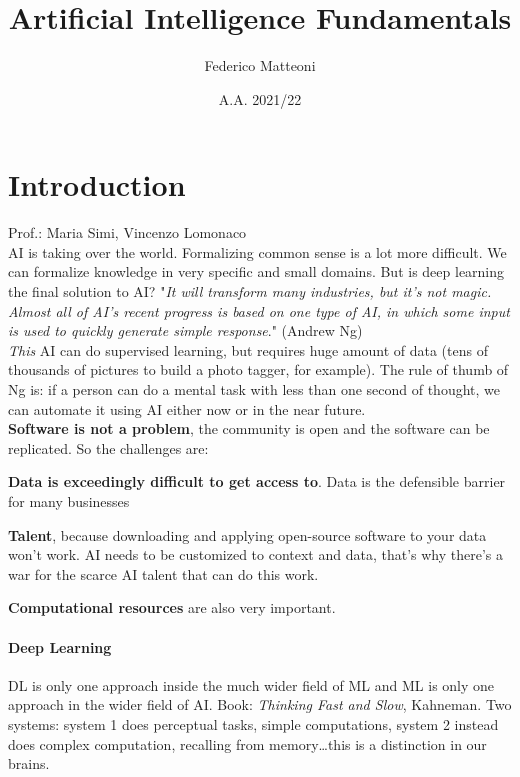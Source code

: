 \documentclass[10pt]{report}
\begin{document}
\title{Artificial Intelligence Fundamentals}
\author{Federico Matteoni}
\date{A.A. 2021/22}
\renewcommand*\contentsname{Index}
\maketitle
\tableofcontents
\pagebreak
\section{Introduction}
Prof.: Maria Simi, Vincenzo Lomonaco\\
AI is taking over the world. Formalizing common sense is a lot more difficult. We can formalize knowledge in very specific and small domains. But is deep learning the final solution to AI? "\textit{It will transform many industries, but it's not magic. Almost all of AI's recent progress is based on one type of AI, in which some input is used to quickly generate simple response}." (Andrew Ng)\\
\textit{This} AI can do supervised learning, but requires huge amount of data (tens of thousands of pictures to build a photo tagger, for example). The rule of thumb of Ng is: if a person can do a mental task with less than one second of thought, we can automate it using AI either now or in the near future.\\
\textbf{Software is not a problem}, the community is open and the software can be replicated. So the challenges are:
\begin{list}{}{}
	\item \textbf{Data is exceedingly difficult to get access to}. Data is the defensible barrier for many businesses
	\item \textbf{Talent}, because downloading and applying open-source software to your data won't work. AI needs to be customized to context and data, that's why there's a war for the scarce AI talent that can do this work.
	\item \textbf{Computational resources} are also very important.
\end{list}
\paragraph{Deep Learning} DL is only one approach inside the much wider field of ML and ML is only one approach in the wider field of AI. Book: \textit{Thinking Fast and Slow}, Kahneman. Two systems: system 1 does perceptual tasks, simple computations, system 2 instead does complex computation, recalling from memory\ldots this is a distinction in our brains.
\end{document}
